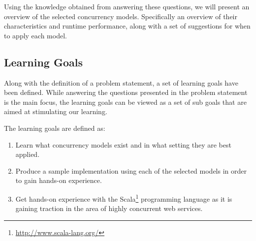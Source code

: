 Using the knowledge obtained from answering these questions, we will present an overview of the selected concurrency models. Specifically an overview of their characteristics and runtime performance, along with a set of suggestions for when to apply each model.

\subsection{Learning Goals}
Along with the definition of a problem statement, a set of learning goals have been defined. While answering the questions presented in the problem statement is the main focus, the learning goals can be viewed as a set of sub goals that are aimed at stimulating our learning.

The learning goals are defined as:
\begin{enumerate}
\item Learn what concurrency models exist and in what setting they are best applied.
\item Produce a sample implementation using each of the selected models in order to gain hands-on experience.
\item Get hands-on experience with the Scala\footnote{\url{http://www.scala-lang.org/}} programming language as it is gaining traction in the area of highly concurrent web services.
\end{enumerate}

\worksheetend